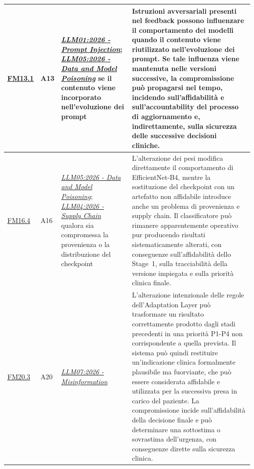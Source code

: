 {\begin{xltabular}{\textwidth}{
    >{\raggedright\arraybackslash}p{1.1cm}
    >{\raggedright\arraybackslash}p{1.1cm}
    >{\raggedright\arraybackslash}p{4.3cm}
    X
}
\midrule


\hyperlink{fm13-1}{FM13.1} &

A13 &

\href{https://genai.owasp.org/resource/owasp-genai-llm-top-10-2026/}
{\textit{LLM01:2026 - Prompt Injection}};
\href{https://genai.owasp.org/resource/owasp-genai-llm-top-10-2026/}
{\textit{LLM05:2026 - Data and Model Poisoning}}
se il contenuto viene incorporato nell'evoluzione dei prompt &

Istruzioni avversariali presenti nel feedback possono influenzare il
comportamento dei modelli quando il contenuto viene riutilizzato
nell'evoluzione dei prompt. Se tale influenza viene mantenuta nelle
versioni successive, la compromissione può propagarsi nel tempo,
incidendo sull'affidabilità e sull'accountability del processo di
aggiornamento e, indirettamente, sulla sicurezza delle successive
decisioni cliniche. \\

\midrule


\hyperlink{fm16-4}{FM16.4} &

A16 &

\href{https://genai.owasp.org/resource/owasp-genai-llm-top-10-2026/}
{\textit{LLM05:2026 - Data and Model Poisoning}};
\href{https://genai.owasp.org/resource/owasp-genai-llm-top-10-2026/}
{\textit{LLM04:2026 - Supply Chain}}
qualora sia compromessa la provenienza o la distribuzione del checkpoint &

L'alterazione dei pesi modifica direttamente il comportamento di
EfficientNet-B4, mentre la sostituzione del checkpoint con un artefatto
non affidabile introduce anche un problema di provenienza e supply chain.
Il classificatore può rimanere apparentemente operativo pur producendo
risultati sistematicamente alterati, con conseguenze sull'affidabilità
dello Stage~1, sulla tracciabilità della versione impiegata e sulla
priorità clinica finale. \\

\midrule


\hyperlink{fm20-3}{FM20.3} &

A20 &

\href{https://genai.owasp.org/resource/owasp-genai-llm-top-10-2026/}
{\textit{LLM07:2026 - Misinformation}} &

L'alterazione intenzionale delle regole dell'Adaptation Layer può
trasformare un risultato correttamente prodotto dagli stadi precedenti
in una priorità P1-P4 non corrispondente a quella prevista. Il sistema
può quindi restituire un'indicazione clinica formalmente plausibile ma
fuorviante, che può essere considerata affidabile e utilizzata per la
successiva presa in carico del paziente. La compromissione incide
sull'affidabilità della decisione finale e può determinare una
sottostima o sovrastima dell'urgenza, con conseguenze dirette sulla
sicurezza clinica. \\


\end{xltabular}}
